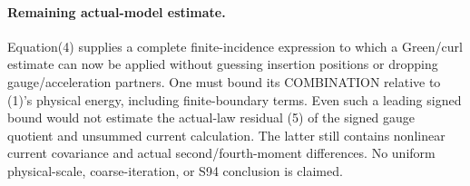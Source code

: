 \documentclass[11pt]{article}
\begin{document}
\paragraph{Remaining actual-model estimate.}
Equation(4) supplies a complete finite-incidence expression to which a
Green/curl estimate can now be applied without guessing insertion positions
or dropping gauge/acceleration partners. One must bound its COMBINATION
relative to (1)'s physical energy, including finite-boundary terms. Even
such a leading signed bound would not estimate the actual-law residual
(5) of the signed gauge quotient and unsummed current calculation. The latter still contains nonlinear current covariance and
actual second/fourth-moment differences. No uniform physical-scale,
coarse-iteration, or S94 conclusion is claimed.
\end{document}
